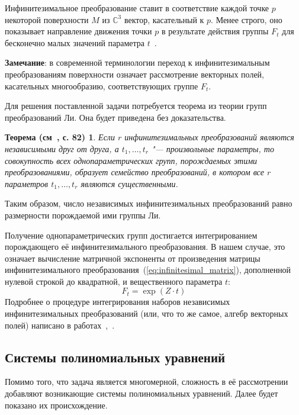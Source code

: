 \documentclass[../main.tex]{subfiles}
\newtheorem*{lie_theorem}{Теорема (см~\cite{lie}, с. 82)}
\begin{document}
Инфинитезимальное преобразование ставит в соответствие каждой точке $p$ некоторой поверхности $M$ из $\mathbb{C}^3$ вектор, касательный к $p$. Менее строго, оно показывает направление движения точки $p$ в результате действия группы $F_t$ для бесконечно малых значений параметра $t$~\cite{lie}.

\textbf{Замечание}: в современной терминологии переход к инфинитезимальным преобразованиям поверхности означает рассмотрение векторных полей, касательных многообразию, соответствующих группе $F_t$.

Для решения поставленной задачи потребуется теорема из теории групп преобразований Ли. Она будет приведена без доказательства.
\begin{lie_theorem}\label{thm:lie}
Если $r$ инфинитезимальных преобразований являются независимыми друг от друга, а $t_1,\hdots,t_r$ "--- произвольные параметры, то совокупность всех однопараметрических групп, порождаемых этими преобразованиями, образует семейство преобразований, в котором все $r$  параметров $t_1,\hdots,t_r$ являются существенными.
\end{lie_theorem}

Таким образом, число независимых инфинитезимальных преобразований равно размерности порождаемой ими группы Ли.

Получение однопараметрических групп достигается интегрированием порождающего её инфинитезимального преобразования. В нашем случае, это означает вычисление матричной экспоненты от произведения матрицы инфинитезимального преобразования~(\ref{eq:infinitesimal_matrix}), дополненной нулевой строкой до квадратной, и вещественного параметра $t$:
$$
	F_t = \exp(Z \cdot t)
$$
Подробнее о процедуре интегрирования наборов независимых инфинитезимальных преобразований (или, что то же самое, алгебр векторных полей) написано в работах~\cite{loboda_hodarev},~\cite{fels}.

\subsection{Системы полиномиальных уравнений}
Помимо того, что задача является многомерной, сложность в её рассмотрении добавляют возникающие системы полиномиальных уравнений. Далее будет показано их происхождение.
\end{document}
